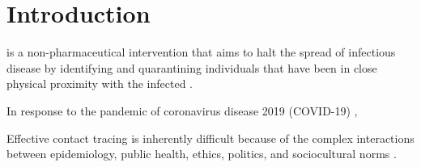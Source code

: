 \chapter{Introduction}


 is a non-pharmaceutical intervention that aims to halt the spread of infectious disease by identifying and quarantining individuals that have been in close physical proximity with the infected \citep{Brandt2022, PozoMartin2023}. 


In response to the pandemic of coronavirus disease 2019 (COVID-19) \citep{Zhu2020, Gorbalenya2020, Singh2021},


Effective contact tracing is inherently difficult because of the complex interactions between epidemiology, public health, ethics, politics, and sociocultural norms \citep{Brandt2022}.




